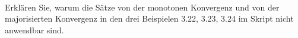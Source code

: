                 \begin{prob} \\
Erkl\"aren Sie, warum die S\"atze von der monotonen Konvergenz und von der majorisierten Konvergenz in den drei Beispielen 3.22, 3.23, 3.24 im Skript nicht anwendbar sind.
\newpage
\vspace{2mm}
                \end{prob}
